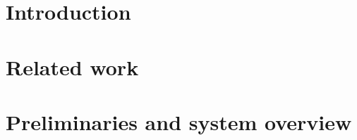 %
%
%
%
%
%
%
%
%
%
%
%
%
%
%
%


\section{Introduction}
\label{sec:intro}

\section{Related work}
\label{sec:related}

\section{Preliminaries and system overview}
\label{sec:prelim}



